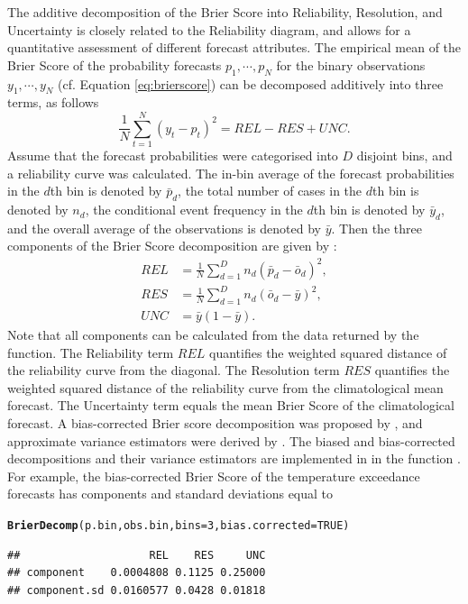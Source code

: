\documentclass[article]{jss}\usepackage{graphicx, color}
\makeatletter
\newcommand{\hlfunctioncall}[1]{\textcolor[rgb]{0,0.501960784313725,0.752941176470588}{\textbf{#1}}}%
\newenvironment{kframe}{%
 \def\at@end@of@kframe{}%
 \ifinner\ifhmode%
  \def\at@end@of@kframe{\end{minipage}}%
  \begin{minipage}{\columnwidth}%
 \fi\fi%
 \def\FrameCommand##1{\hskip\@totalleftmargin \hskip-\fboxsep
 \colorbox{shadecolor}{##1}\hskip-\fboxsep
     \hskip-\linewidth \hskip-\@totalleftmargin \hskip\columnwidth}%
 \MakeFramed {\advance\hsize-\width
   \@totalleftmargin\z@ \linewidth\hsize
   \@setminipage}}%
 {\par\unskip\endMakeFramed%
 \at@end@of@kframe}
\newenvironment{knitrout}{}{} %
\makeatother
\begin{document}
The additive decomposition of the Brier Score into Reliability, Resolution, and Uncertainty is closely related to the Reliability diagram, and allows for a quantitative assessment of different forecast attributes.
The empirical mean of the Brier Score of the probability forecasts $p_1, \cdots, p_N$ for the binary observations $y_1, \cdots, y_N$ (cf. Equation \ref{eq:brierscore}) can be decomposed additively into three terms, as follows
%
\begin{equation}
\frac{1}{N}\sum_{t=1}^N (y_t - p_t)^2 = REL - RES + UNC.
\end{equation}
%
Assume that the forecast probabilities were categorised into $D$ disjoint bins, and a reliability curve was calculated.
The in-bin average of the forecast probabilities in the $d$th bin is denoted by $\bar{p}_d$, the total number of cases in the $d$th bin is denoted by $n_d$, the conditional event frequency in the $d$th bin is denoted by $\bar{y}_d$, and the overall average of the observations is denoted by $\bar{y}$.
Then the three components of the Brier Score decomposition are given by \citep{murphy1973new}:
%
\begin{align}
REL & = \frac{1}{N}\sum_{d=1}^D n_d (\bar{p}_d - \bar{o}_d)^2,\\
RES & = \frac{1}{N}\sum_{d=1}^D n_d (\bar{o}_d - \bar{y})^2,\\
UNC & = \bar{y}(1-\bar{y}).
\end{align}
%
Note that all components can be calculated from the data returned by the  function.
The Reliability term $REL$ quantifies the weighted squared distance of the reliability curve from the diagonal.
The Resolution term $RES$ quantifies the weighted squared distance of the reliability curve from the climatological mean forecast.
The Uncertainty term equals the mean Brier Score of the climatological forecast.
A bias-corrected Brier score decomposition was proposed by \citet{ferro2012bias}, and approximate variance estimators were derived by \citet{siegert2013variance}.
The biased and bias-corrected decompositions and their variance estimators are implemented in  in the function .
For example, the bias-corrected Brier Score of the temperature exceedance forecasts has components and standard deviations equal to
%
\begin{knitrout}
\color{fgcolor}\begin{kframe}
\begin{alltt}
\hlfunctioncall{BrierDecomp}(p.bin, obs.bin, bins=3, bias.corrected=TRUE)
\end{alltt}
\begin{verbatim}
##                    REL    RES     UNC
## component    0.0004808 0.1125 0.25000
## component.sd 0.0160577 0.0428 0.01818
\end{verbatim}
\end{kframe}
\end{knitrout}
\end{document}
